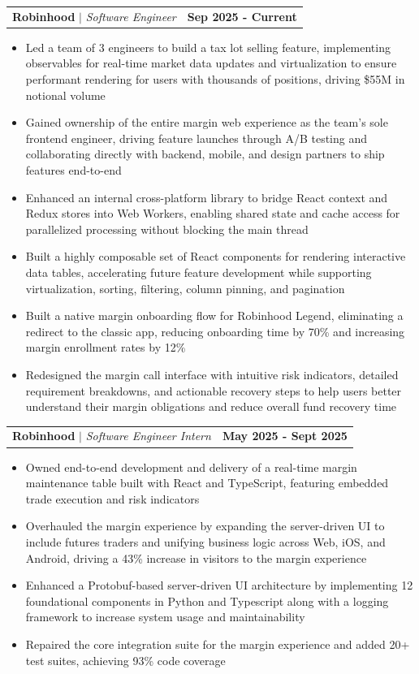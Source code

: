 \documentclass[11pt]{article}
\makeatletter
\newcommand{\resumeItem}[1]{
  \item\small{
    {\fontfamily{lmss}#1 \vspace{-2pt}}
  }
}
\newcommand{\resumeSubheadingUpd}[4]{
  \vspace{2pt}\item
    \begin{tabular*}{0.95\textwidth}[t]{l@{\extracolsep{\fill}}r}
      \hspace{1.2em}\textbf{#1} $|$ \textit{\small#3} & {\bfseries #2}
    \end{tabular*}\vspace{-7pt}
}
\newcommand{\resumeItemListStart}{\begin{itemize}}
\newcommand{\resumeItemListEnd}{\end{itemize}\vspace{-5pt}}
\makeatother
\begin{document}
\resumeSubheadingUpd{Robinhood}{Sep 2025 - Current}{Software Engineer}{Toronto, ON}
\vspace{0.3em}
\resumeItemListStart
\resumeItem{Led a team of 3 engineers to build a tax lot selling feature, implementing observables for real-time market data updates and virtualization to ensure performant rendering for users with thousands of positions, driving \$55M in notional volume}
\resumeItem{Gained ownership of the entire margin web experience as the team's sole frontend engineer, driving feature launches through A/B testing and collaborating directly with backend, mobile, and design partners to ship features end-to-end}
\resumeItem{Enhanced an internal cross-platform library to bridge React context and Redux stores into Web Workers, enabling shared state and cache access for parallelized processing without blocking the main thread}
\resumeItem{Built a highly composable set of React components for rendering interactive data tables, accelerating future feature development while supporting virtualization, sorting, filtering, column pinning, and pagination}
\resumeItem{Built a native margin onboarding flow for Robinhood Legend, eliminating a redirect to the classic app, reducing onboarding time by 70\% and increasing margin enrollment rates by 12\%}
\resumeItem{Redesigned the margin call interface with intuitive risk indicators, detailed requirement breakdowns, and actionable recovery steps to help users better understand their margin obligations and reduce overall fund recovery time}
\resumeItemListEnd


\resumeSubheadingUpd{Robinhood}{May 2025 - Sept 2025}{Software Engineer Intern}{Toronto, ON}
\vspace{0.3em}
\resumeItemListStart
\resumeItem{Owned end-to-end development and delivery of a real-time margin maintenance table built with React and TypeScript, featuring embedded trade execution and risk indicators}
\resumeItem{Overhauled the margin experience by expanding the server-driven UI to include futures traders and unifying business logic across Web, iOS, and Android, driving a 43\% increase in visitors to the margin experience}
\resumeItem{Enhanced a Protobuf-based server-driven UI architecture by implementing 12 foundational components in Python and Typescript along with a logging framework to increase system usage and maintainability}
\resumeItem{Repaired the core integration suite for the margin experience and added 20+ test suites, achieving 93\% code coverage}
\resumeItemListEnd
\end{document}
